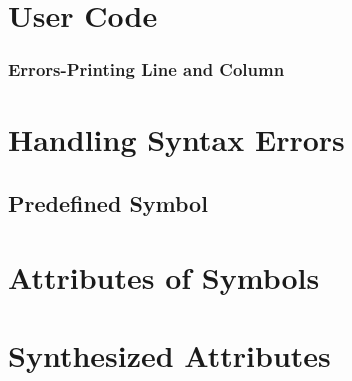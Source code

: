 \section{User Code}

\subsubsection{Errors-Printing Line and Column}

\section{Handling Syntax Errors}

\subsection{ Predefined Symbol}

\section{Attributes of Symbols}

\section{Synthesized Attributes}

